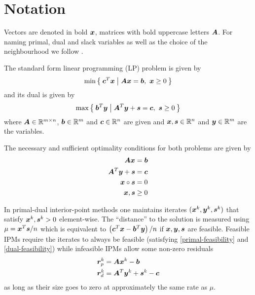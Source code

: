 \chapter{Notation}

Vectors are denoted in bold \(\bm{x}\), matrices with bold uppercase letters \(\bm{A}\). For naming primal, dual and slack variables as well as the choice of the neighbourhood we follow \cite{Monteiro-ConvergenceAnalysisLongStepInfeasibleIPMs}.

The standard form linear programming (LP) problem is given by
\begin{equation}
 \min \Set{\bm{c}^T \bm{x} | \bm{A}\bm{x} = \bm{b}, \ \bm{x} \geq 0} 
\end{equation}
and its dual is given by
\begin{equation}
  \max \Set{\bm{b}^T \bm{y} | \bm{A}^T \bm{y} + \bm{s} = \bm{c}, \ \bm{s} \geq 0 }
\end{equation}
where \(\bm{A} \in \mathbb{R}^{m \times n}\), \(\bm{b} \in \mathbb{R}^m\) and \(\bm{c} \in \mathbb{R}^n\) are given and \(\bm{x}, \bm{s} \in \mathbb{R}^n\) and \(\bm{y} \in \mathbb{R}^m\) are the variables.

The necessary and sufficient optimality conditions for both problems are given by
\begin{subequations} \label{optimality-conditions}
  \begin{align}
    \bm{A} \bm{x} &= \bm{b} \label{primal-feasibility} \\
    \bm{A}^T \bm{y} + \bm{s} &= \bm{c} \label{dual-feasibility} \\
    \bm{x} \circ \bm{s} &= 0 \label{complementarity} \\
    \bm{x}, \bm{s} &\geq 0 \label{nonnegativity}
  \end{align}
\end{subequations}

In primal-dual interior-point methods one maintains iterates \((\bm{x}^k, \bm{y}^k, \bm{s}^k)\) that satisfy \(\bm{x}^k, \bm{s}^k > 0\) element-wise.
The \enquote{distance} to the solution is measured using \(\mu = \bm{x}^T \bm{s}/n\) which is equivalent to \(\left(\bm{c}^T\bm{x} - \bm{b}^T\bm{y}\right)/n\) if \(\bm{x}, \bm{y}, \bm{s}\) are feasible.
Feasible IPMs require the iterates to always be feasible (satisfying \cref{primal-feasibility} and \cref{dual-feasibility}) while infeasible IPMs allow some non-zero residuals
\begin{align}
  \bm{r}^k_p &= \bm{A}\bm{x}^k - \bm{b} \\
  \bm{r}^k_d &= \bm{A}^T \bm{y}^k + \bm{s}^k - \bm{c}
\end{align}
as long as their size goes to zero at approximately the same rate as \(\mu\).

